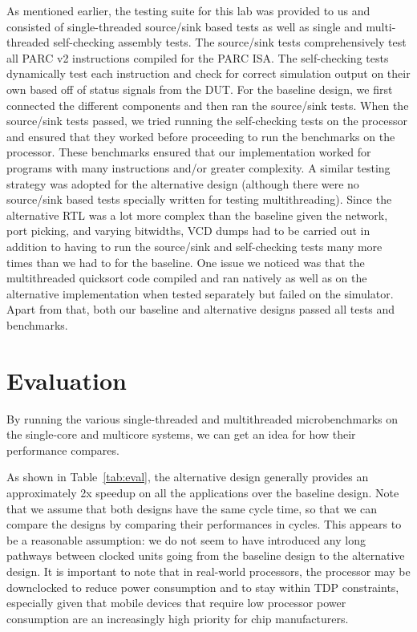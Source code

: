 \documentclass[10pt]{article}
\begin{document}
As mentioned earlier, the testing suite for this lab was provided to us and consisted of single-threaded source/sink based tests as well as single and multi-threaded self-checking assembly tests. The source/sink tests comprehensively test all PARC v2 instructions compiled for the PARC ISA. The self-checking tests dynamically test each instruction and check for correct simulation output on their own based off of status signals from the DUT. For the baseline design, we first connected the different components and then ran the source/sink tests. When the source/sink tests passed, we tried running the self-checking tests on the processor and ensured that they worked before proceeding to run the benchmarks on the processor. These benchmarks ensured that our implementation worked for programs with many instructions and/or greater complexity. A similar testing strategy was adopted for the alternative design (although there were no source/sink based tests specially written for testing multithreading). Since the alternative RTL was a lot more complex than the baseline given the network, port picking, and varying bitwidths, VCD dumps had to be carried out in addition to having to run the source/sink and self-checking tests many more times than we had to for the baseline. One issue we noticed was that the multithreaded quicksort code compiled and ran natively as well as on the alternative implementation when tested separately but failed on the simulator. Apart from that, both our baseline and alternative designs passed all tests and benchmarks. 



\section{Evaluation}

By running the various single-threaded and multithreaded microbenchmarks on the single-core and multicore systems, we can get an idea for how their performance compares. \par

As shown in Table~\ref{tab:eval}, the alternative design generally provides an approximately 2x speedup on all the applications over the baseline design. Note that we assume that both designs have the same cycle time, so that we can compare the designs by comparing their performances in cycles. This appears to be a reasonable assumption: we do not seem to have introduced any long pathways between clocked units going from the baseline design to the alternative design. It is important to note that in real-world processors, the processor may be downclocked to reduce power consumption and to stay within TDP constraints, especially given that mobile devices that require low processor power consumption are an increasingly high priority for chip manufacturers. \par
\end{document}
